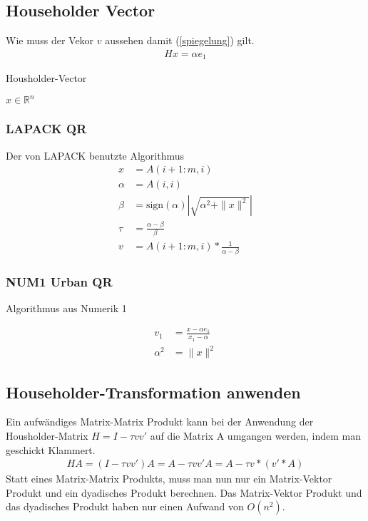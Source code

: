 \subsection{Householder Vector}
Wie muss der Vekor $v$ aussehen damit (\ref{spiegelung}) gilt.
\begin{align*}
	Hx = \alpha e_1
\end{align*}
\begin{algorithm}
	\caption{Housholder-Vector}
	\begin{algorithmic}
		\State $x \in \mathbb{R}^n$
	\end{algorithmic} 
	\label{alg:unblockedqr}
\end{algorithm}

\subsubsection{LAPACK QR}
Der von LAPACK benutzte Algorithmus \cite{DGEQR2}
\begin{align*}
x &= A(i+1:m,i)\\
\alpha &= A(i,i)\\
\beta &= \text{sign}(\alpha) \left|\sqrt{\alpha^2 + \|x\|^2}\right|\\
\tau &= \frac{\alpha - \beta}{\beta} \\
v &= A(i+1:m,i) * \frac{1}{\alpha - \beta}
\end{align*}

\subsubsection{NUM1 Urban QR}
Algorithmus aus Numerik 1

\begin{align*}
v_1 &= \frac{x - \alpha e_1}{x_1 - \alpha}\\
\alpha ^2 &= \|x\|^2 
\end{align*}

\subsection{Householder-Transformation anwenden}
Ein aufwändiges Matrix-Matrix Produkt kann bei der Anwendung der Housholder-Matrix $H = I - \tau vv'$ auf die Matrix A umgangen werden, indem man geschickt Klammert.
\begin{align*} 
H A =(I - \tau vv') A= A - \tau vv' A = A - \tau v*(v'*A)
\end{align*}
Statt eines Matrix-Matrix Produkts, muss man nun nur ein Matrix-Vektor Produkt und ein dyadisches Produkt berechnen.
Das Matrix-Vektor Produkt und das dyadisches Produkt haben nur einen Aufwand von $O(n^2)$.




